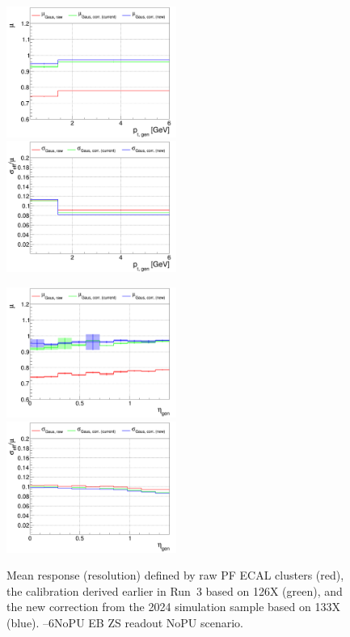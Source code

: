 \begin{figure}
\includegraphics[width=0.495\textwidth]{./plots_pdf/ECAL_plots/plotsNOPU/EB/ZS/pdf/GENPT/EBZS_GENPT_0000_0006_MuOverBins.pdf}
\includegraphics[width=0.495\textwidth]{./plots_pdf/ECAL_plots/plotsNOPU/EB/ZS/pdf/GENPT/EBZS_GENPT_0000_0006_EffSigmaOverBins.pdf}

\includegraphics[width=0.495\textwidth]{./plots_pdf/ECAL_plots/plotsNOPU/EB/ZS/pdf/GENETA/EBZS_GENETA_0000_0006_MuOverBins.pdf}
\includegraphics[width=0.495\textwidth]{./plots_pdf/ECAL_plots/plotsNOPU/EB/ZS/pdf/GENETA/EBZS_GENETA_0000_0006_EffSigmaOverBins.pdf}
\caption[$\mu$ ($\sigma_\mathrm{eff}$) vs. \pt of PF ECAL cluster - EB ZS readout NoPU scenario]{Mean response (resolution) defined by raw PF ECAL clusters (red), the calibration derived earlier in Run~3 based on 126X (green), and the new correction from the 2024 simulation sample based on 133X (blue). --6\GeV NoPU EB ZS readout NoPU scenario.}
\end{figure}

